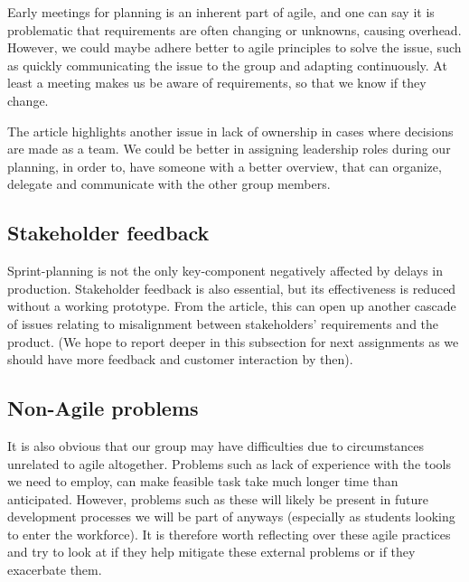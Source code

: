 Early meetings for planning is an inherent part of agile, and one can say it is problematic that requirements are often changing or unknowns, causing overhead. However, we could maybe adhere better to agile principles to solve the issue, such as quickly communicating the issue to the group and adapting continuously. At least a meeting makes us be aware of requirements, so that we know if they change.

The article highlights another issue in lack of ownership in cases where decisions are made as a team. We could be better in assigning leadership roles during our planning, in order to, have someone with a better overview, that can organize, delegate and communicate with the other group members.


\subsection{Stakeholder feedback}
Sprint-planning is not the only key-component negatively affected by delays in production. Stakeholder feedback is also essential, but its effectiveness is reduced without a working prototype. From the article, this can open up another cascade of issues relating to misalignment between stakeholders' requirements and the product.
(We hope to report deeper in this subsection for next assignments as we should have more feedback and customer interaction by then).

\subsection{Non-Agile problems}
It is also obvious that our group may have difficulties due to circumstances unrelated to agile altogether. Problems such as lack of experience with the tools we need to employ, can make feasible task take much longer time than anticipated. However, problems such as these will likely be present in future development processes we will be part of anyways (especially as students looking to enter the workforce). It is therefore worth reflecting over these agile practices and try to look at if they help mitigate these external problems or if they exacerbate them.
